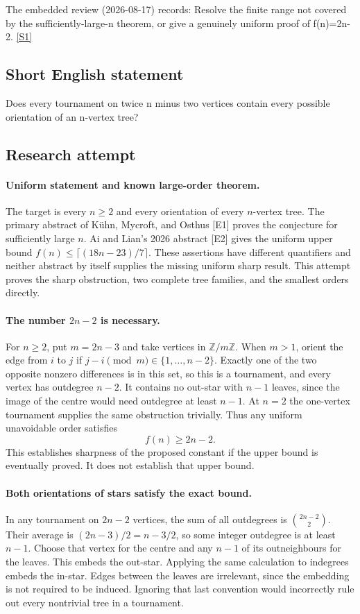 \documentclass[11pt,a4paper]{article}
\newcommand{\Z}{\mathbb{Z}}
\newcommand{\sref}[2]{\hyperlink{source:#1:#2}{[S#2]}}
\begin{document}
The embedded review (2026-08-17) records: Resolve the finite range not covered by the sufficiently-large-n theorem, or give a genuinely uniform proof of f(n)=2n-2. \sref{statement}{1}

\subsection{Short English statement}

Does every tournament on twice n minus two vertices contain every possible orientation of an n-vertex tree?

\subsection{Research attempt}

\paragraph{Uniform statement and known large-order theorem.}
The target is every $n\ge2$ and every orientation of every $n$-vertex
tree. The primary abstract of K\"uhn, Mycroft, and Osthus [E1] proves
the conjecture for sufficiently large $n$. Ai and Lian's 2026 abstract
[E2] gives the uniform upper bound
$f(n)\le\lceil(18n-23)/7\rceil$. These assertions have different
quantifiers and neither abstract by itself supplies the missing uniform
sharp result. This attempt proves the sharp obstruction, two complete
tree families, and the smallest orders directly.

\paragraph{The number $2n-2$ is necessary.}
For $n\ge2$, put $m=2n-3$ and take vertices in $\Z/m\Z$.
When $m>1$, orient the edge from $i$ to $j$ if
$j-i\pmod m\in\{1,\ldots,n-2\}$. Exactly one of the two
opposite nonzero differences is in this set, so this is a tournament,
and every vertex has outdegree $n-2$. It contains no out-star with
$n-1$ leaves, since the image of the centre would need outdegree
at least $n-1$. At $n=2$ the one-vertex tournament supplies the
same obstruction trivially. Thus any uniform unavoidable order satisfies
\[
                              f(n)\ge2n-2.
\]
This establishes sharpness of the proposed constant if the upper bound
is eventually proved. It does not establish that upper bound.

\paragraph{Both orientations of stars satisfy the exact bound.}
In any tournament on $2n-2$ vertices, the sum of all outdegrees is
$\binom{2n-2}{2}$. Their average is $(2n-3)/2=n-3/2$, so some
integer outdegree is at least $n-1$. Choose that vertex for the centre
and any $n-1$ of its outneighbours for the leaves. This embeds the
out-star. Applying the same calculation to indegrees embeds the
in-star. Edges between the leaves are irrelevant, since the embedding
is not required to be induced. Ignoring that last convention would
incorrectly rule out every nontrivial tree in a tournament.
\end{document}
